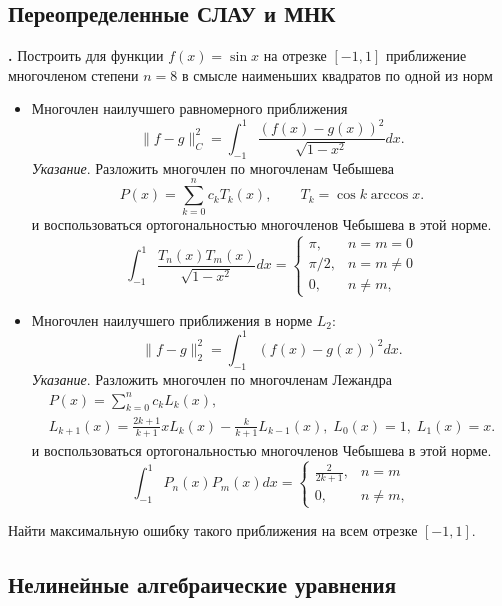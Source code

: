 \documentclass[12pt]{article}
\newcounter{task}
\newcommand{\problem}{\par\textbf{\stepcounter{task}\thetask. }}
\begin{document}
\subsection{Переопределенные СЛАУ и МНК}

\problem Построить для функции $f(x) = \sin x$ на отрезке $[-1, 1]$
приближение многочленом степени $n = 8$ в смысле наименьших квадратов по одной из норм
\begin{itemize}
\item Многочлен наилучшего равномерного приближения
\[
\|f - g\|_C^2 = \int_{-1}^1 \frac{(f(x) - g(x))^2}{\sqrt{1-x^2}} dx.
\]
\emph{Указание}. Разложить многочлен по многочленам Чебышева
\[
P(x) = \sum_{k=0}^n c_k T_k(x), \qquad
T_k = \cos k \arccos x.
\]
и воспользоваться ортогональностью многочленов Чебышева в этой норме.
\[
\int_{-1}^1 \frac{T_n(x) T_m(x)}{\sqrt{1-x^2}} dx = \begin{cases}
\pi, & n = m = 0\\
\pi/2, & n = m \neq 0\\
0, & n \neq m,
\end{cases}
\]
\item Многочлен наилучшего приближения в норме $L_2$:
\[
\|f - g\|_2^2 = \int_{-1}^1 (f(x) - g(x))^2 dx.
\]
\emph{Указание}. Разложить многочлен по многочленам Лежандра
\begin{gather*}
P(x) = \sum_{k=0}^n c_k L_k(x), \\
L_{k+1}(x) = \frac{2k+1}{k+1} x L_k(x) - \frac{k}{k+1} L_{k-1}(x), \;
L_0(x) = 1,\; L_1(x) = x.
\end{gather*}
и воспользоваться ортогональностью многочленов Чебышева в этой норме.
\[
\int_{-1}^1 P_n(x) P_m(x) dx = \begin{cases}
\frac{2}{2k+1}, & n = m\\
0, & n \neq m,
\end{cases}
\]
\end{itemize}
Найти максимальную ошибку такого приближения на всем отрезке $[-1, 1]$.

\subsection{Нелинейные алгебраические уравнения}
\end{document}
